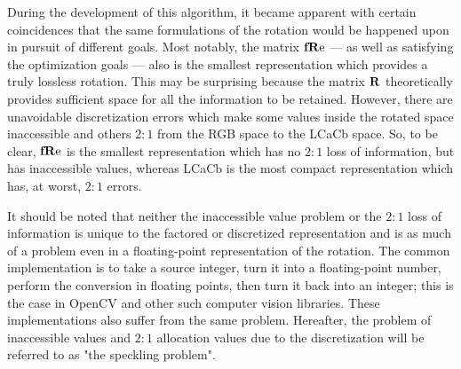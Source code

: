 During the development of this algorithm, it became apparent with certain coincidences that the same formulations of the rotation would be happened upon in pursuit of different goals. Most notably, the matrix $\fRe$ --- as well as satisfying the optimization goals --- also is the smallest representation which provides a truly lossless rotation. This may be surprising because the matrix $\R$ theoretically provides sufficient space for all the information to be retained. However, there are unavoidable discretization errors which make some values inside the rotated space inaccessible and others $2:1$ from the RGB space to the LCaCb space. So, to be clear, $\fRe$ is the smallest representation which has no $2:1$ loss of information, but has inaccessible values, whereas LCaCb is the most compact representation which has, at worst, $2:1$ errors. 

It should be noted that neither the inaccessible value problem or the $2:1$ loss of information is unique to the factored or discretized representation and is as much of a problem even in a floating-point representation of the rotation. The common implementation is to take a source integer, turn it into a floating-point number, perform the conversion in floating points, then turn it back into an integer; this is the case in OpenCV and other such computer vision libraries. These implementations also suffer from the same problem. Hereafter, the problem of inaccessible values and $2:1$ allocation values due to the discretization will be referred to as "the speckling problem". 





